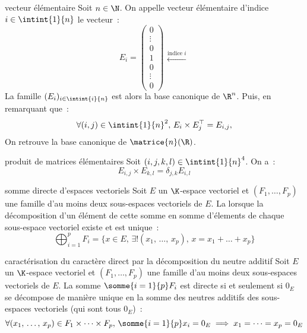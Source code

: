 

\begin{adjustwidth}{-3cm}{-3cm}


\begin{definition}{5.1}{vecteur élémentaire}
    Soit $n \in \N$. On appelle vecteur élémentaire d'indice $i\in \intint{1}{n}$ le vecteur~:
    $$E_i =
    \begin{pmatrix}
    0 \\
    \vdots \\
    0 \\
    1 \\
    0 \\
    \vdots \\
    0
    \end{pmatrix}
    \begin{array}{c}
     \\
     \\
     \xleftarrow{\text{indice } i} \\
     \\
     \\
    \end{array}$$
    La famille $(E_i)_{i \in \intint{i}{n}}$ est alors la base canonique de $\R^n$. Puis, en remarquant que~:
    $$\forall (i,j) \in \intint{1}{n}^2,\, E_i \times E_j^\top = E_{i,j},$$
    On retrouve la base canonique de $\matrice{n}(\R)$.
\end{definition}

\begin{proposition}{5.2}{produit de matrices élémentaires}
    Soit $(i,j,k,l) \in \intint{1}{n}^4$. On a~:
    $$E_{i,j} \times E_{k,l} = \delta_{j,k} E_{i,l} $$
\end{proposition}

\begin{definition}{5.3}{somme directe d'espaces vectoriels}
    Soit $E$ un $\K$-espace vectoriel et $(F_1, \dots , F_p)$ une famille d'au moins deux sous-espaces vectoriels de $E$. La  lorsque la décomposition d'un élément de cette somme en somme d'élements de chaque sous-espace vectoriel existe et est unique~:
    $$\bigoplus_{i=1}^{p} F_i = \{x \in E,\, \exists!(x_1,\, \dots,\, x_p),\, x = x_1 + \dots + x_p\}$$
\end{definition}

\begin{proposition}{5.4}{caractérisation du caractère direct par la décomposition du neutre additif}
    Soit $E$ un $\K$-espace vectoriel et $(F_1, \dots , F_p)$ une famille d'au moins deux sous-espaces vectoriels de $E$. La somme $\somme{i=1}{p}F_i$ est directe si et seulement si $0_E$ se décompose de manière unique en la somme des neutres additifs des sous-espaces vectoriels (qui sont tous $0_E$)~:
    $$\forall (x_1,\, \dots,\, x_p) \in F_1 \times \dots \times F_p,\, \somme{i=1}{p}x_i = 0_E \implies x_1 = \dots = x_p = 0_E$$
\end{proposition}


\end{adjustwidth}
